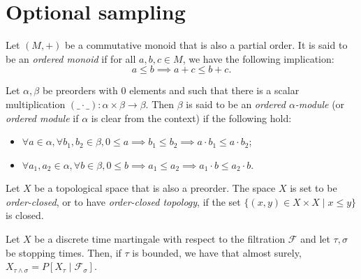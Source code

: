 \section{Optional sampling}

\begin{definition}\label{def:isOrderedAddMonoid}
  \mathlibok
Let $(M, +)$ be a commutative monoid that is also a partial order. It is said to be an \emph{ordered monoid} if for all $a, b, c \in M$, we have the following implication:
$$a \le b \implies a + c \le b + c.$$
\end{definition}

\begin{definition}\label{def:isOrderedModule}
  \mathlibok
Let $\alpha, \beta$ be preorders with $0$ elements and such that there is a scalar multiplication $(\_ \cdot \_) : \alpha \times \beta \to \beta$. Then $\beta$ is said to be an \emph{ordered $\alpha$-module} (or \emph{ordered module} if $\alpha$ is clear from the context) if the following hold:
\begin{itemize}
  \item $\forall a \in \alpha, \forall b_1, b_2 \in \beta, 0 \le a \implies b_1 \le b_2 \implies a \cdot b_1 \le a \cdot b_2$;
  \item $\forall a_1, a_2 \in \alpha, \forall b \in \beta, 0 \le b \implies a_1 \le a_2 \implies a_1 \cdot b \le a_2 \cdot b$.
\end{itemize}
\end{definition}

\begin{definition}\label{def:orderClosedTopology}
  \mathlibok
Let $X$ be a topological space that is also a preorder. The space $X$ is set to be \emph{order-closed}, or to have \emph{order-closed topology}, if the set $\{(x, y) \in X \times X \mid x \le y\}$ is closed.
\end{definition}

\begin{lemma}\label{lem:optionalSampling_discrete}
  \mathlibok
  Let $X$ be a discrete time martingale with respect to the filtration $\mathcal{F}$ and let
  $\tau, \sigma$ be stopping times. Then, if $\tau$ is bounded, we have that almost surely,
  $X_{\tau \wedge \sigma} = P[X_{\tau} \mid \mathcal{F}_{\sigma}]$.
\end{lemma}

